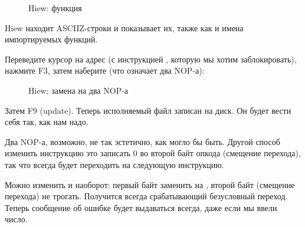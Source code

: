 \begin{figure}[H]
\centering
{}
\caption{Hiew: функция \main}
\label{fig:scanf_ex3_hiew_1}
\end{figure}

Hiew находит \ac{ASCIIZ}-строки и показывает их, также как и имена импортируемых функций.

\clearpage
Переведите курсор на адрес  (с инструкцией , которую мы хотим заблокировать), нажмите F3, затем наберите  (что означает два \ac{NOP}-а):

\begin{figure}[H]
\centering
{}
\caption{Hiew: замена  на два \ac{NOP}-а}
\label{fig:scanf_ex3_hiew_2}
\end{figure}

Затем F9 (update). Теперь исполняемый файл записан на диск. Он будет вести себя так, как нам надо.

Два \ac{NOP}-а, возможно, не так эстетично, как могло бы быть.
Другой способ изменить инструкцию это записать 0 во второй байт опкода (смещение перехода),
так что  всегда будет переходить на следующую инструкцию.

Можно изменить и наоборот: первый байт заменить на , второй байт (смещение перехода) не трогать.
Получится всегда срабатывающий безусловный переход.
Теперь сообщение об ошибке будет выдаваться всегда, даже если мы ввели число.

